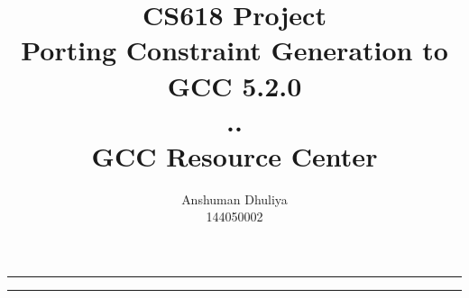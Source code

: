 \documentclass[a4paper]{article}
\author{Anshuman Dhuliya\\144050002}
\title{CS618 Project\\Porting Constraint Generation to GCC 5.2.0\\..\\ GCC Resource Center}
\begin{document}
\maketitle

\noindent
\rule{\textwidth}{2pt}%

\tableofcontents

\noindent
\rule{\textwidth}{2pt}%



%
%
\end{document}
